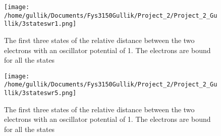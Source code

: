 \documentclass[11pt,a4wide]{article}
\begin{document}
	\begin{figure}
		\texttt{[image: /home/gullik/Documents/Fys3150Gullik/Project\_2/Project\_2\_Gullik/3stateswr1.png]}
		\caption{The first three states of the relative distance between the two electrons with an oscillator potential of 1. 
		The electrons are bound for all the states}
		\label{fig:1}
	\end{figure}
	
	\begin{figure}
		\texttt{[image: /home/gullik/Documents/Fys3150Gullik/Project\_2/Project\_2\_Gullik/3stateswr5.png]}
		\caption{The first three states of the relative distance between the two electrons with an oscillator potential of 1. 
		The electrons are bound for all the states}
		\label{fig:5}
	\end{figure}
\end{document}
